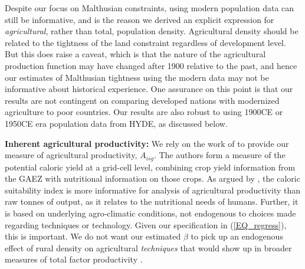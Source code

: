 \documentclass[11pt]{article}
\begin{document}
Despite our focus on Malthusian constraints, using modern population data can still be informative, and is the reason we derived an explicit expression for \textit{agricultural}, rather than total, population density. Agricultural density should be related to the tightness of the land constraint regardless of development level. But this does raise a caveat, which is that the nature of the agricultural production function may have changed after 1900 relative to the past, and hence our estimates of Malthusian tightness using the modern data may not be informative about historical experience. One assurance on this point is that our results are not contingent on comparing developed nations with modernized agriculture to poor countries. Our results are also robust to using 1900CE or 1950CE era population data from HYDE, as discussed below.

\vspace{.5cm}\noindent\textbf{Inherent agricultural productivity:} We rely on the work of \citet{galorozak2016} to provide our measure of agricultural productivity, $A_{isg}$. The authors form a measure of the potential caloric yield at a grid-cell level, combining crop yield information from the GAEZ with nutritional information on those crops. As argued by \citet{galorozak2016}, the caloric suitability index is more informative for analysis of agricultural productivity than raw tonnes of output, as it relates to the nutritional needs of humans. Further, it is based on underlying agro-climatic conditions, not endogenous to choices made regarding techniques or technology. Given our specification in (\ref{EQ_regress}), this is important. We do not want our estimated $\beta$ to pick up an endogenous effect of rural density on agricultural \textit{techniques} that would show up in broader measures of total factor productivity \citep{Boserup1965}.
\end{document}
